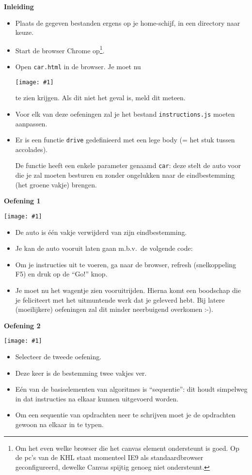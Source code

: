 \documentclass[a4paper]{article}
\newcommand{\newexercise}[1]{\clearpage\begin{center}\Huge\bf #1\end{center}}
\newcommand{\exercisemap}[1]{\begin{center}\texttt{[image: \#1]}\end{center}}
\newcommand{\code}[1]{
  \begin{center}
    \begin{minipage}{.8\linewidth}
      
    \end{minipage}
  \end{center}
}
\begin{document}
\newexercise{Inleiding}
\begin{itemize}
  \item Plaats de gegeven bestanden ergens op je home-schijf, in een directory naar keuze.
  \item Start de browser Chrome op\footnote{Om het even welke browser
        die het canvas element ondersteunt is goed. Op de pc's van de KHL
        staat momenteel IE9 als standaardbrowser geconfigureerd, dewelke
        Canvas spijtig genoeg niet ondersteunt.}.
  \item Open \verb'car.html' in de browser. Je moet nu
        \exercisemap{ex1} te zien krijgen. Als dit niet het geval is,
        meld dit meteen.
  \item Voor elk van deze oefeningen zal je het bestand \verb'instructions.js' moeten aanpassen.
  \item Er is een functie \verb'drive' gedefinieerd met een lege body (= het stuk tussen accolades).
        \code{drive.js}
        De functie heeft een enkele parameter genaamd \verb'car': deze
        stelt de auto voor die je zal moeten besturen en zonder ongelukken
        naar de eindbestemming (het groene vakje) brengen.
\end{itemize}


\newexercise{Oefening 1}
\exercisemap{ex1}

\begin{itemize}
  \item De auto is \'e\'en vakje verwijderd van zijn eindbestemming.
  \item Je kan de auto vooruit laten gaan m.b.v.\ de volgende code:
        \code{forward.js}
  \item Om je instructies uit te voeren, ga naar de browser, refresh (snelkoppeling F5) en druk op de ``Go!'' knop.
  \item Je moet nu het wagentje zien vooruitrijden. Hierna komt
        een boodschap die je feliciteert met het uitmuntende werk dat je geleverd
        hebt. Bij latere (moeilijkere) oefeningen zal dit minder neerbuigend overkomen :-).
\end{itemize}


\newexercise{Oefening 2}
\exercisemap{ex2}

\begin{itemize}
  \item Selecteer de tweede oefening.
  \item Deze keer is de bestemming twee vakjes ver.
  \item E\'en van de basiselementen van algoritmes is ``sequentie'':
        dit houdt simpelweg in dat instructies na elkaar
        kunnen uitgevoerd worden.
  \item Om een sequentie van opdrachten neer te schrijven
        moet je de opdrachten gewoon na elkaar in te typen.
\end{itemize}
\end{document}
